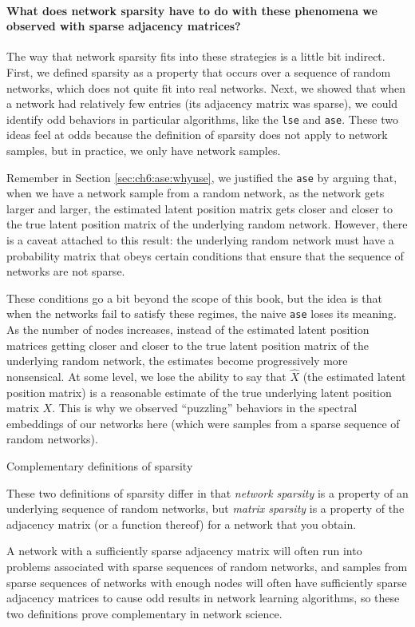 \paragraph*{What does network sparsity have to do with these phenomena we observed with sparse adjacency matrices?}

The way that network sparsity fits into these strategies is a little bit indirect. First, we defined sparsity as a property that occurs over a sequence of random networks, which does not quite fit into real networks. Next, we showed that when a network had relatively few entries (its adjacency matrix was sparse), we could identify odd behaviors in particular algorithms, like the \texttt{lse} and \texttt{ase}. These two ideas feel at odds because the definition of sparsity does not apply to network samples, but in practice, we only have network samples.

Remember in Section \ref{sec:ch6:ase:whyuse}, we justified the \texttt{ase} by arguing that, when we have a network sample from a random network, as the network gets larger and larger, the estimated latent position matrix gets closer and closer to the true latent position matrix of the underlying random network. However, there is a caveat attached to this result: the underlying random network must have a probability matrix that obeys certain conditions \cite{Athreya2017Jan,Krzakala2013Dec} that ensure that the sequence of networks are not sparse. 

These conditions go a bit beyond the scope of this book, but the idea is that when the networks fail to satisfy these regimes, the naive \texttt{ase} loses its meaning. As the number of nodes increases, instead of the estimated latent position matrices getting closer and closer to the true latent position matrix of the underlying random network, the estimates become progressively more nonsensical. At some level, we lose the ability to say that $\hat X$ (the estimated latent position matrix) is a reasonable estimate of the true underlying latent position matrix $X$. This is why we observed ``puzzling'' behaviors in the spectral embeddings of our networks here (which were samples from a sparse sequence of random networks). 

\begin{floatingbox}[h]\caption{Complementary definitions of sparsity}
These two definitions of sparsity differ in that \textit{network sparsity} is a property of an underlying sequence of random networks, but \textit{matrix sparsity} is a property of the adjacency matrix (or a function thereof) for a network that you obtain. 

A network with a sufficiently sparse adjacency matrix will often run into problems associated with sparse sequences of random networks, and samples from sparse sequences of networks with enough nodes will often have sufficiently sparse adjacency matrices to cause odd results in network learning algorithms, so these two definitions prove complementary in network science.
\end{floatingbox}

\newpage
